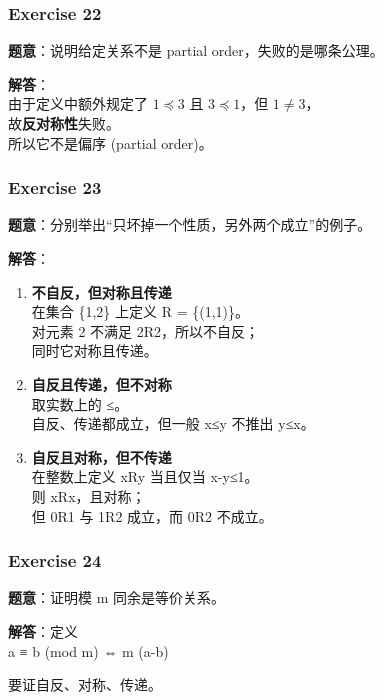 \documentclass[
  11pt,
]{article}
\begin{document}
\subsubsection{Exercise 22}\label{exercise-22}

\textbf{题意}：说明给定关系不是 partial order，失败的是哪条公理。

\textbf{解答}：\\
由于定义中额外规定了 \(1\preceq 3\) 且 \(3\preceq 1\)，但
\(1\neq 3\)，\\
故\textbf{反对称性}失败。\\
所以它不是偏序 (partial order)。

\subsubsection{Exercise 23}\label{exercise-23}

\textbf{题意}：分别举出``只坏掉一个性质，另外两个成立''的例子。

\textbf{解答}：

\begin{enumerate}
\def\labelenumi{\arabic{enumi}.}
\item
  \textbf{不自反，但对称且传递}\\
  在集合 \{1,2\} 上定义 R = \{(1,1)\}。\\
  对元素 2 不满足 2R2，所以不自反；\\
  同时它对称且传递。
\item
  \textbf{自反且传递，但不对称}\\
  取实数上的 ≤。\\
  自反、传递都成立，但一般 x≤y 不推出 y≤x。
\item
  \textbf{自反且对称，但不传递}\\
  在整数上定义 xRy 当且仅当 \textbar x-y\textbar≤1。\\
  则 xRx，且对称；\\
  但 0R1 与 1R2 成立，而 0R2 不成立。
\end{enumerate}

\subsubsection{Exercise 24}\label{exercise-24}

\textbf{题意}：证明模 m 同余是等价关系。

\textbf{解答}：定义\\
a ≡ b (mod m) ⇔ m \textbar{} (a-b)

要证自反、对称、传递。
\end{document}
